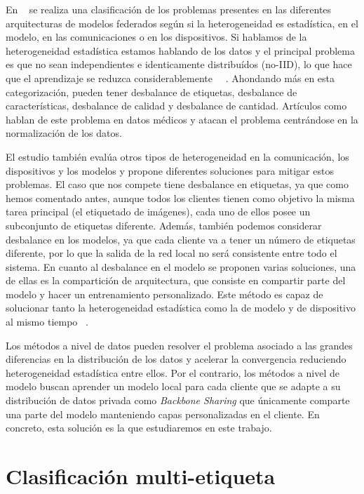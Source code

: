 En ~\cite{Ye:HFL_Survey} se realiza una clasificación de los problemas presentes en las diferentes arquitecturas de modelos federados según si la heterogeneidad es estadística, en el modelo, en las comunicaciones o en los dispositivos. Si hablamos de la heterogeneidad estadística estamos hablando de los datos y el principal problema es que no sean independientes e identicamente distribuídos (no-IID), lo que hace que el aprendizaje se reduzca considerablemente ~\cite{Zhao_ML}~\cite{criado2021noniiddatacontinuallearning}. Ahondando más en esta categorización, pueden tener desbalance de etiquetas, desbalance de características, desbalance de calidad y desbalance de cantidad. Artículos como ~\cite{Zhaobin:FedMLP} hablan de este problema en datos médicos y atacan el problema centrándose en la normalización de los datos.

El estudio también evalúa otros tipos de heterogeneidad en la comunicación, los dispositivos y los modelos y propone diferentes soluciones para mitigar estos problemas. El caso que nos compete tiene desbalance en etiquetas, ya que como hemos comentado antes, aunque todos los clientes tienen como objetivo la misma tarea principal (el etiquetado de imágenes), cada uno de ellos posee un subconjunto de etiquetas diferente. Además, también podemos considerar desbalance en los modelos, ya que cada cliente va a tener un número de etiquetas diferente, por lo que la salida de la red local no será consistente entre todo el sistema. En cuanto al desbalance en el modelo se proponen varias soluciones, una de ellas es la compartición de arquitectura, que consiste en compartir parte del modelo y hacer un entrenamiento personalizado. Este método es capaz de solucionar tanto la heterogeneidad estadística como la de modelo y de dispositivo al mismo tiempo ~\cite{Manoj:FedPer}.

Los métodos a nivel de datos pueden resolver el problema asociado a las grandes diferencias en la distribución de los datos y acelerar la convergencia reduciendo heterogeneidad estadística entre ellos. Por el contrario, los métodos a nivel de modelo buscan aprender un modelo local para cada cliente que se adapte a su distribución de datos privada como \textit{Backbone Sharing} que únicamente comparte una parte del modelo manteniendo capas personalizadas en el cliente. En concreto, esta solución es la que estudiaremos en este trabajo.

\newpage

\section{Clasificación multi-etiqueta}

